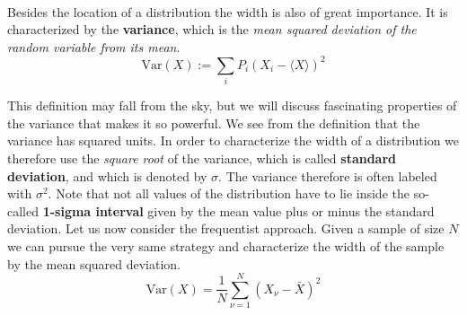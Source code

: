 \documentclass[12pt, a4paper]{scrartcl}
\begin{document}
\\

Besides the location of a distribution the width is also of great importance. It is characterized by the \textbf{variance}, which is the \textit{mean squared deviation of the random variable from its mean}.\\

\begin{equation*}\boxed{\text{Var}(X):=\sum_iP_i(X_i-\langle X \rangle)^2}\end{equation*}

This definition may fall from the sky, but we will discuss fascinating properties of the variance that makes it so powerful.
We see from the definition that the variance has squared units. In order to characterize the width of a distribution we therefore use the \textit{square root} of the variance, which is called \textbf{standard deviation}, and which is denoted by $\sigma$. 
The variance therefore is often labeled with $\sigma^2$. Note that not all values of the distribution have to lie inside the so-called \textbf{1-sigma interval} given by the mean value plus or minus the standard deviation.
Let us now consider the frequentist approach. Given a sample of size $N$ we can pursue the very same strategy and characterize the width of the sample by the mean squared deviation.\\

\begin{equation*}\boxed{\text{Var}(X)=\frac 1N\sum_{\nu = 1}^N(X_\nu-\bar{X})^2}\end{equation*}
\end{document}
